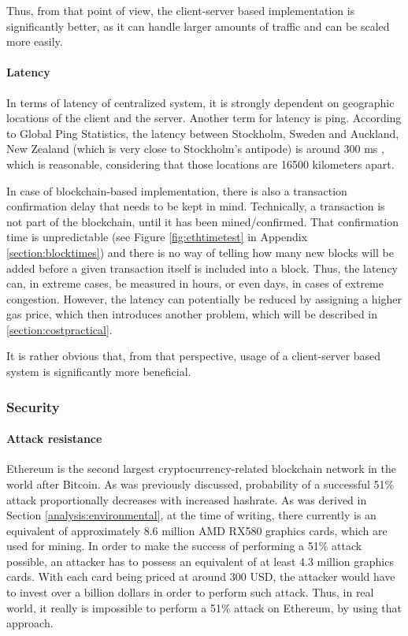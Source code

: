 Thus, from that point of view, the client-server based implementation is significantly better, as it can handle larger amounts of traffic and can be scaled more easily.

\paragraph{Latency}
In terms of latency of centralized system, it is strongly dependent on geographic locations of the client and the server. Another term for latency is ping. According to Global Ping Statistics, the latency between Stockholm, Sweden and Auckland, New Zealand (which is very close to Stockholm's antipode) is around 300 ms \citep{pingstats}, which is reasonable, considering that those locations are 16500 kilometers apart.

In case of blockchain-based implementation, there is also a transaction confirmation delay that needs to be kept in mind. Technically, a transaction is not part of the blockchain, until it has been mined/confirmed. That confirmation time is unpredictable (see Figure \ref{fig:ethtimetest} in Appendix \ref{section:blocktimes}) and there is no way of telling how many new blocks will be added before a given transaction itself is included into a block. Thus, the latency can, in extreme cases, be measured in hours, or even days, in cases of extreme congestion. However, the latency can potentially be reduced by assigning a higher gas price, which then introduces another problem, which will be described in \ref{section:costpractical}.

It is rather obvious that, from that perspective, usage of a client-server based system is significantly more beneficial.

\subsubsection{Security}

\paragraph{Attack resistance}
Ethereum is the second largest cryptocurrency-related blockchain network in the world after Bitcoin. As was previously discussed, probability of a successful 51\% attack proportionally decreases with increased hashrate. As was derived in Section \ref{analysis:environmental}, at the time of writing, there currently is an equivalent of approximately 8.6 million AMD RX580 graphics cards, which are used for mining. In order to make the success of performing a 51\% attack possible, an attacker has to possess an equivalent of at least 4.3 million graphics cards. With each card being priced at around 300 USD, the attacker would have to invest over a billion dollars in order to perform such attack. Thus, in real world, it really is impossible to perform a 51\% attack on Ethereum, by using that approach. 

